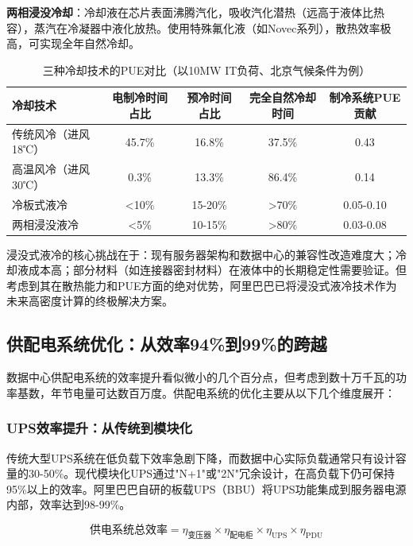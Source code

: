 \textbf{两相浸没冷却}：冷却液在芯片表面沸腾汽化，吸收汽化潜热（远高于液体比热容），蒸汽在冷凝器中液化放热。使用特殊氟化液（如Novec系列），散热效率极高，可实现全年自然冷却。

\begin{table}[htbp]
\centering
\caption{三种冷却技术的PUE对比（以10MW IT负荷、北京气候条件为例）}
\begin{tabular}{lcccc}
\toprule
\textbf{冷却技术} & \textbf{电制冷时间占比} & \textbf{预冷时间占比} & \textbf{完全自然冷却时间} & \textbf{制冷系统PUE贡献} \\
\midrule
传统风冷（进风18℃） & 45.7\% & 16.8\% & 37.5\% & 0.43 \\
高温风冷（进风30℃） & 0.3\% & 13.3\% & 86.4\% & 0.14 \\
冷板式液冷 & <10\% & 15-20\% & >70\% & 0.05-0.10 \\
两相浸没液冷 & <5\% & 10-15\% & >80\% & 0.03-0.08 \\
\bottomrule
\end{tabular}
\label{tab:cooling-pue-analysis}
\end{table}

浸没式液冷的核心挑战在于：现有服务器架构和数据中心的兼容性改造难度大；冷却液成本高；部分材料（如连接器密封材料）在液体中的长期稳定性需要验证。但考虑到其在散热能力和PUE方面的绝对优势，阿里巴巴已将浸没式液冷技术作为未来高密度计算的终极解决方案。

\subsection{供配电系统优化：从效率94\%到99\%的跨越}

数据中心供配电系统的效率提升看似微小的几个百分点，但考虑到数十万千瓦的功率基数，年节电量可达数百万度。供配电系统的优化主要从以下几个维度展开：

\subsubsection{UPS效率提升：从传统到模块化}

传统大型UPS系统在低负载下效率急剧下降，而数据中心实际负载通常只有设计容量的30-50\%。现代模块化UPS通过"N+1"或"2N"冗余设计，在高负载下仍可保持95\%以上的效率。阿里巴巴自研的板载UPS（BBU）将UPS功能集成到服务器电源内部，效率达到98-99\%。

\begin{equation}
    \text{供电系统总效率} = \eta_{\text{变压器}} \times \eta_{\text{配电柜}} \times \eta_{\text{UPS}} \times \eta_{\text{PDU}}
\end{equation}

